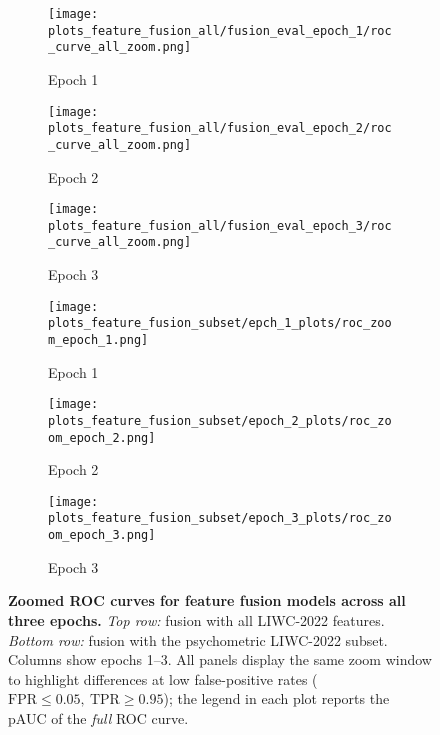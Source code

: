 \begin{figure}[H]
  \centering

  \begin{subfigure}[t]{0.32\textwidth}
    \centering
    \texttt{[image: plots\_feature\_fusion\_all/fusion\_eval\_epoch\_1/roc\_curve\_all\_zoom.png]}
    \caption{Epoch 1}
    \label{fig:ffroc_psy_e1}
  \end{subfigure}\hfill
  \begin{subfigure}[t]{0.32\textwidth}
    \centering
    \texttt{[image: plots\_feature\_fusion\_all/fusion\_eval\_epoch\_2/roc\_curve\_all\_zoom.png]}
    \caption{Epoch 2}
    \label{fig:ffroc_psy_e2}
  \end{subfigure}\hfill
  \begin{subfigure}[t]{0.32\textwidth}
    \centering
    \texttt{[image: plots\_feature\_fusion\_all/fusion\_eval\_epoch\_3/roc\_curve\_all\_zoom.png]}
    \caption{Epoch 3}
    \label{fig:ffroc_psy_e3}
  \end{subfigure}

    \vspace{0.45cm}


    \begin{subfigure}[t]{0.32\textwidth}
    \centering
    \texttt{[image: plots\_feature\_fusion\_subset/epch\_1\_plots/roc\_zoom\_epoch\_1.png]}
    \caption{Epoch 1}
    \label{fig:ffroc_all_e1}
  \end{subfigure}\hfill
  \begin{subfigure}[t]{0.32\textwidth}
    \centering
    \texttt{[image: plots\_feature\_fusion\_subset/epoch\_2\_plots/roc\_zoom\_epoch\_2.png]}
    \caption{Epoch 2}
    \label{fig:ffroc_all_e2}
  \end{subfigure}\hfill
  \begin{subfigure}[t]{0.32\textwidth}
    \centering
    \texttt{[image: plots\_feature\_fusion\_subset/epoch\_3\_plots/roc\_zoom\_epoch\_3.png]}
    \caption{Epoch 3}
    \label{fig:ffroc_all_e3}
  \end{subfigure}


  \caption[Zoomed ROC curves for feature fusion models across epochs.]{\textbf{Zoomed ROC curves for feature fusion models across all three epochs.}
  \emph{Top row:} fusion with all LIWC-2022 features. \emph{Bottom row:} fusion with the psychometric LIWC-2022 subset.
  Columns show epochs 1–3. All panels display the same zoom window to highlight differences at low false-positive rates
  (\(\mathrm{FPR}\le 0.05,\ \mathrm{TPR}\ge 0.95\)); the legend in each plot reports the pAUC of the \emph{full} ROC curve.}
  \label{fig:ff_roc_zoom_epochs}
\end{figure}

